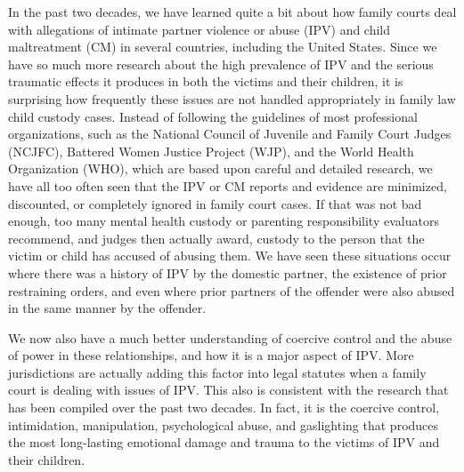 

\hspace{-5em}\begin{minipage}{1.1\textwidth}
\begin{flushright}
{\fontsize{14}{22}\selectfont
\textbf{%
}
}
\end{flushright}
\end{minipage}


\vspace{6em}


\noindent{}In the past two decades, we have learned quite a bit about how family courts deal with allegations of intimate partner violence or abuse (IPV) and child maltreatment
(CM) in several countries, including the United
States. Since we have so much more research about the high prevalence
of IPV and the serious traumatic effects it produces in both the victims
and their children, it is surprising how frequently these issues are not
handled appropriately in family law child custody cases. Instead of following the guidelines of most professional organizations, such as the
National Council of Juvenile and Family Court Judges (NCJFC), 
Battered Women Justice Project (WJP), and the World Health Organization
(WHO), which are based upon careful and detailed research, we have all
too often seen that the IPV or CM reports and evidence are minimized,
discounted, or completely ignored in family court cases. If that was not
bad enough, too many mental health custody or parenting responsibility
evaluators recommend, and judges then actually award, custody to the
person that the victim or child has accused of abusing them. We have
seen these situations occur where there was a history of IPV by the domestic partner, the existence of prior restraining orders, and even where
prior partners of the offender were also abused in the same manner by
the offender. \pfl{}

We now also have a much better understanding of coercive control
and the abuse of power in these relationships, and how it is a major aspect of IPV. More jurisdictions are actually adding this factor into legal
statutes when a family court is dealing with issues of IPV. This also is
 consistent with the research that has been compiled over the past two
decades. In fact, it is the coercive control, intimidation, manipulation,
psychological abuse, and gaslighting that produces the most long-lasting
emotional damage and trauma to the victims of IPV and their children. \pfl{}


